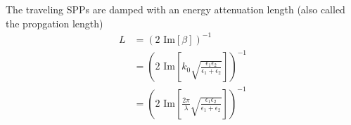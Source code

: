\documentclass[12pt]{article}
\numberwithin{equation}{section}
\newcommand{\blue}[1]{\textcolor{blue}{#1}} %
\begin{document}
The traveling SPPs are damped with an energy attenuation length (also called the propgation length) 
\begin{equation*}
\begin{aligned}
L &= (2 \textrm{ Im} [ \beta ] )^{-1} \\
&= \left ( 2 \textrm{ Im} \left [ k_0 \sqrt{ \frac{\epsilon_1 \epsilon_2}{\epsilon_1 + \epsilon_2}} \right ] \right )^{-1} \\
&= \left ( 2 \textrm{ Im} \left [ \frac{2 \pi}{\lambda} \sqrt{ \frac{\epsilon_1 \epsilon_2}{\epsilon_1 + \epsilon_2}} \right ] \right )^{-1}
\end{aligned}
\end{equation*}




\begin{equation}
\end{equation}





\end{document}
